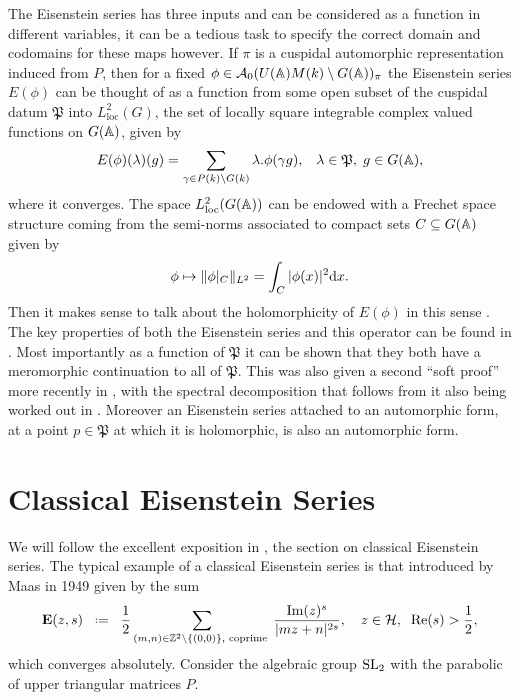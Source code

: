 The Eisenstein series has three inputs and can be considered as a function in different variables, it can be a tedious task to specify the correct domain and codomains for these maps however. If \(\pi\) is a cuspidal automorphic representation induced from \(P\), then for a fixed \(\phi \in\mathcal{A}_0(U(\A)M(k)\setminus G(\A))_\pi \) the Eisenstein series \(E(\phi)\) can be thought of as a function from some open subset of the cuspidal datum \(\mathfrak{P}\) into \(L^2_{\mathrm{loc}}(G)\), the set of locally square integrable complex valued functions on \(G(\A)\), given by 
\[E(\phi)(\lambda)(g) = \sum_{\gamma \in P(k)\backslash G(k)} \lambda.\phi(\gamma g), \;\;\; \lambda\in \mathfrak{P},\; g\in G(\A),\]
where it converges. The space \(L^2_{\mathrm{loc}}(G(\A))\) can be endowed with a Frechet space structure coming from the semi-norms associated to compact sets \(C\subseteq G(\A)\) given by 
\[\phi \mapsto \norm{\phi|_C}_{L^2} = \int_C |\phi(x)|^2 \mathrm{d}x.\] 
Then it makes sense to talk about the holomorphicity of \(E(\phi)\) in this sense \cite[I.4.9]{moeglinSpectralDecompositionEisenstein1995}. The key properties of both the Eisenstein series and this operator can be found in \cite[IV.1.8, IV.1.9, IV.1.10, IV.1.11]{moeglinSpectralDecompositionEisenstein1995}. Most importantly as a function of \(\mathfrak{P}\) it can be shown that they both have a meromorphic continuation to all of \(\mathfrak{P}\). This was also given a second ``soft proof'' more recently in \cite{bernsteinMeromorphicContinuationEisenstein2023}, with the spectral decomposition that follows from it also being worked out in \cite{delormeSpectralTheoremLanglands2021}. Moreover an Eisenstein series attached to an automorphic form, at a point \(p\in \mathfrak{P}\) at which it is holomorphic, is also an automorphic form. 

\section{Classical Eisenstein Series}\label{sec:classic-eisenstein}

We will follow the excellent exposition in \cite{garrettTransitionEisensteinSeries2016}, the section \cite[1.2]{bruinier123ModularForms2008} on classical Eisenstein series. The typical example of a classical Eisenstein series is that introduced by Maas in 1949 \cite{lapidPerspectivesEisensteinSeries2022}  given by the sum 
\[\mathbf{E}(z, s) \defeq \frac{1}{2} \sum_{(m,n)\in \Z^2\setminus \{(0,0)\}, \text{ coprime }} \frac{\mathrm{Im}(z)^{s}}{|mz+n|^{2s}}, \quad z\in \mathcal{H},\;\; \mathrm{Re}(s)>\frac{1}{2},\]
which converges absolutely. Consider the algebraic group \(\operatorname{SL}_2\) with the parabolic of upper triangular matrices \(P\).


